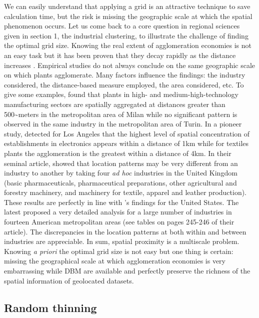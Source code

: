 \documentclass[fleqn,10pt]{latex/stylish_article} %
\begin{document}
We can easily understand that applying a grid is an attractive technique to save calculation time, but the risk is missing the geographic scale at which the spatial phenomenon occurs.
Let us come back to a core question in regional sciences given in section 1, the industrial clustering, to illustrate the challenge of finding the optimal grid size.
Knowing the real extent of agglomeration economies is not an easy task but it has been proven that they decay rapidly as the distance increases \citep{Rosenthal2003, Rosenthal2020}.
Empirical studies do not always conclude on the same geographic scale on which plants agglomerate.
Many factors influence the findings: the industry considered, the distance-based measure employed, the area considered, etc.
To give some examples, \citet{Giuliani2014} found that plants in high- and medium-high-technology manufacturing sectors are spatially aggregated at distances greater than 500\textasciitilde meters in the metropolitan area of Milan while no significant pattern is observed in the same industry in the metropolitan area of Turin.
In a pioneer study, \citet{Sweeney2004} detected for Los Angeles that the highest level of spatial concentration of establishments in electronics appears within a distance of 1km while for textiles plants the agglomeration is the greatest within a distance of 4km.
In their seminal article, \citet{Duranton2005} showed that location patterns may be very different from an industry to another by taking four \emph{ad hoc} industries in the United Kingdom (basic pharmaceuticals, pharmaceutical preparations, other agricultural and forestry machinery, and machinery for textile, apparel and leather production).
These results are perfectly in line with \citet{Feser2002}'s findings for the United States.
The latest proposed a very detailed analysis for a large number of industries in fourteen American metropolitan areas (see tables on pages 245-246 of their article).
The discrepancies in the location patterns at both within and between industries are appreciable.
In sum, spatial proximity is a multiscale problem.
Knowing \emph{a priori} the optimal grid size is not easy but one thing is certain: missing the geographical scale at which agglomeration economies is very embarrassing while DBM are available and perfectly preserve the richness of the spatial information of geolocated datasets.

\subsection{Random thinning}\label{random-thinning}
\end{document}
